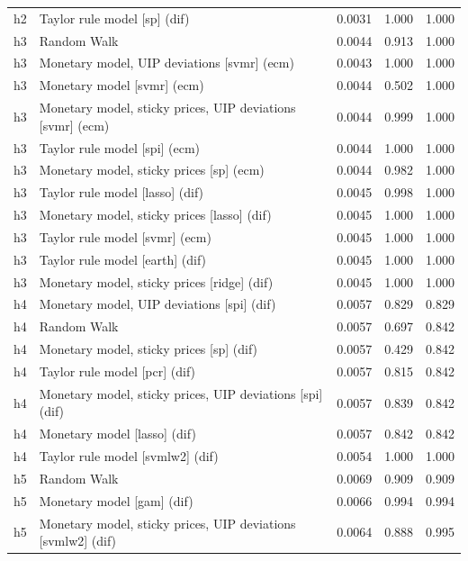 \begin{ThreePartTable}
\begin{longtable}[t]{cp{5.5cm}ccc}
h2 & \raggedright Taylor rule model [sp] (dif) & 0.0031 & 1.000 & 1.000\\
\addlinespace
h3 & \raggedright Random Walk & 0.0044 & 0.913 & 1.000\\
h3 & \raggedright Monetary model, UIP deviations [svmr] (ecm) & 0.0043 & 1.000 & 1.000\\
h3 & \raggedright Monetary model [svmr] (ecm) & 0.0044 & 0.502 & 1.000\\
h3 & \raggedright Monetary model, sticky prices, UIP deviations [svmr] (ecm) & 0.0044 & 0.999 & 1.000\\
h3 & \raggedright Taylor rule model [spi] (ecm) & 0.0044 & 1.000 & 1.000\\
h3 & \raggedright Monetary model, sticky prices [sp] (ecm) & 0.0044 & 0.982 & 1.000\\
h3 & \raggedright Taylor rule model [lasso] (dif) & 0.0045 & 0.998 & 1.000\\
h3 & \raggedright Monetary model, sticky prices [lasso] (dif) & 0.0045 & 1.000 & 1.000\\
h3 & \raggedright Taylor rule model [svmr] (ecm) & 0.0045 & 1.000 & 1.000\\
h3 & \raggedright Taylor rule model [earth] (dif) & 0.0045 & 1.000 & 1.000\\
h3 & \raggedright Monetary model, sticky prices [ridge] (dif) & 0.0045 & 1.000 & 1.000\\
\addlinespace
h4 & \raggedright Monetary model, UIP deviations [spi] (dif) & 0.0057 & 0.829 & 0.829\\
h4 & \raggedright Random Walk & 0.0057 & 0.697 & 0.842\\
h4 & \raggedright Monetary model, sticky prices [sp] (dif) & 0.0057 & 0.429 & 0.842\\
h4 & \raggedright Taylor rule model [pcr] (dif) & 0.0057 & 0.815 & 0.842\\
h4 & \raggedright Monetary model, sticky prices, UIP deviations [spi] (dif) & 0.0057 & 0.839 & 0.842\\
h4 & \raggedright Monetary model [lasso] (dif) & 0.0057 & 0.842 & 0.842\\
h4 & \raggedright Taylor rule model [svmlw2] (dif) & 0.0054 & 1.000 & 1.000\\
\addlinespace
h5 & \raggedright Random Walk & 0.0069 & 0.909 & 0.909\\
h5 & \raggedright Monetary model [gam] (dif) & 0.0066 & 0.994 & 0.994\\
h5 & \raggedright Monetary model, sticky prices, UIP deviations [svmlw2] (dif) & 0.0064 & 0.888 & 0.995\\

\end{longtable}
\end{ThreePartTable}
